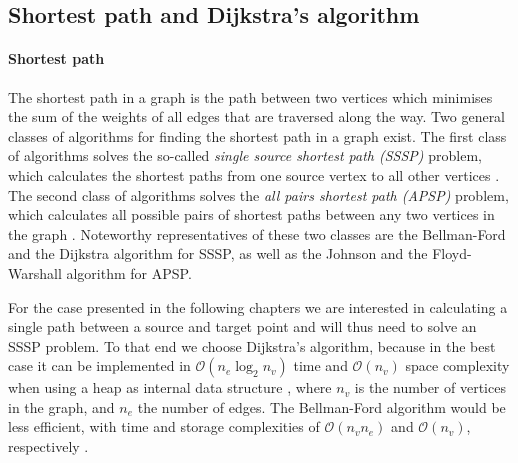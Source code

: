 \subsection{Shortest path and Dijkstra's algorithm}
\label{sec:dijkstra}
\paragraph{Shortest path}
The shortest path in a graph is the path between two vertices which minimises the sum of the weights
of all edges that are traversed along the way.
Two general classes of algorithms for finding the shortest path in a graph exist.
The first class of algorithms solves the so-called \textit{single source shortest path (SSSP)} problem,
which calculates the shortest paths from one source vertex to all other vertices \cite[pp. 273-297]{Erickson2019}.
The second class of algorithms solves the \textit{all pairs shortest path (APSP)} problem, which calculates
all possible pairs of shortest paths between any two vertices in the graph \cite[pp. 309-320]{Erickson2019}.
Noteworthy representatives of these two classes are the Bellman-Ford \cite[pp. 11-14]{FUH_algo_graphs_2021} 
and the Dijkstra algorithm \cite[pp. 14-18]{FUH_algo_graphs_2021} for SSSP, 
as well as the Johnson \cite[pp. 19-21]{FUH_algo_graphs_2021} 
and the Floyd-Warshall algorithm \cite[pp. 21-24]{FUH_algo_graphs_2021} for APSP.

For the case presented in the following chapters we are interested in calculating a single path between 
a source and target point and will thus need to solve an SSSP problem.
To that end we choose Dijkstra's algorithm, because in the best case it can be implemented 
in $\mathcal{O}\left( n_e \log_2 n_v \right)$ time and $\mathcal{O}\left( n_v \right)$ space 
complexity when using a heap as internal data structure \cite[pp. 17-18]{FUH_algo_graphs_2021}, 
where $n_v$ is the number of vertices in the graph, and $n_e$ the number of edges.
The Bellman-Ford algorithm would be less efficient, with time and storage complexities of 
$\mathcal{O}\left( n_v n_e \right)$ and $\mathcal{O}\left( n_v \right)$, respectively 
\cite[pp. 13]{FUH_algo_graphs_2021}.


